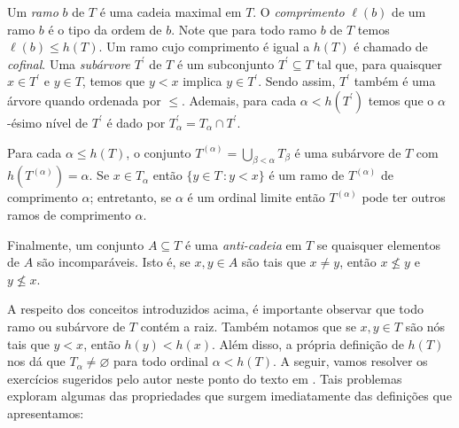 \documentclass[a4paper]{article}
\begin{document}
Um \emph{ramo} \(b\) de \(T\) é uma cadeia maximal em \(T\).  O \emph{comprimento}
\(\ell(b)\) de um ramo \(b\) é o tipo da ordem de \(b\). Note que para
todo ramo \(b\) de \(T\) temos \(\ell (b)\leq h(T)\).
Um ramo cujo comprimento é igual a \(h(T)\) é chamado de \emph{cofinal}.
Uma \emph{subárvore} \(T^\prime\) de \(T\) é um subconjunto
\(T^\prime\subseteq T\) tal que, para quaisquer \(x\in T^\prime\) e \(y\in T\),
temos que \(y<x\) implica \(y\in T^\prime\).
Sendo assim, \(T^\prime\) também é uma árvore quando ordenada por \(\leq\).
Ademais, para cada \(\alpha < h(T^\prime)\) temos que o \(\alpha\)-ésimo nível
de \(T^\prime\) é dado por \(T_\alpha^\prime= T_\alpha \cap T^\prime\).

 Para cada \(\alpha\leq h(T)\), o conjunto \(T^{(\alpha)}=\bigcup_{\beta <
   \alpha} T_\beta\) é uma subárvore de \(T\) com  \(h(T^{(\alpha)})=\alpha\).
 Se \(x\in T_\alpha\) então \(\{y\in T\,\colon y < x\}\) é um ramo de \(T^{(\alpha)}\) de
comprimento \(\alpha\); entretanto, se \(\alpha\) é um ordinal limite então
\(T^{(\alpha)}\) pode ter outros ramos de comprimento \(\alpha\).

Finalmente, um conjunto \(A\subseteq T\) é uma \emph{anti-cadeia} em \(T\) se
quaisquer elementos de \(A\) são incomparáveis. Isto é, se \(x,y\in A\) são tais
que \(x\not = y\), então \(x\not \leq y\) e \(y\not \leq x\).

A respeito dos conceitos introduzidos acima, é importante observar que todo
ramo ou subárvore de \(T\) contém a raiz. Também notamos que se \(x,y\in T\)
são nós tais que \(y< x\), então \(h(y) <h(x)\). Além disso, a própria definição
de \(h(T)\) nos dá que \(T_\alpha\not=\varnothing\) para todo ordinal
\(\alpha<h(T)\). A seguir, vamos resolver os
exercícios sugeridos pelo autor neste ponto do texto em \cite{jech}. Tais problemas
exploram algumas das propriedades que surgem imediatamente das
definições que apresentamos:
\end{document}
